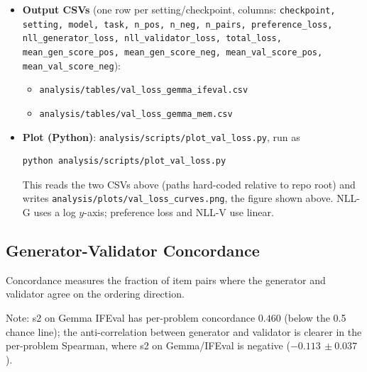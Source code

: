\documentclass[11pt,a4paper]{article}
\newcommand{\se}[1]{{\,\scriptstyle\pm#1}}
\begin{document}
\begin{itemize}
\begin{verbatim}
# Membership val-loss, evaluated on rosch (5 jobs: 44831-44835, ~14m each)
TASK=membership-sans-rosch-v0 \
TEST_TASK=rosch-all \
OUTPUT=analysis/tables/val_loss_gemma_mem.csv \
bash scripts/run_val_loss.sh
\end{verbatim}
Both runs use the default \texttt{MODEL=google/gemma-2-9b-it}, \texttt{MODELS\_DIR=/datastor2/jdr/rankalign/models2-rerun-wandb}, and \texttt{SETTINGS="s1 s2 s3 s4 s7"}.
\item \textbf{Output CSVs} (one row per setting/checkpoint, columns: \texttt{checkpoint, setting, model, task, n\_pos, n\_neg, n\_pairs, preference\_loss, nll\_generator\_loss, nll\_validator\_loss, total\_loss, mean\_gen\_score\_pos, mean\_gen\_score\_neg, mean\_val\_score\_pos, mean\_val\_score\_neg}):
\begin{itemize}
\item \texttt{analysis/tables/val\_loss\_gemma\_ifeval.csv}
\item \texttt{analysis/tables/val\_loss\_gemma\_mem.csv}
\end{itemize}
\item \textbf{Plot (Python)}: \texttt{analysis/scripts/plot\_val\_loss.py}, run as
\begin{verbatim}
python analysis/scripts/plot_val_loss.py
\end{verbatim}
This reads the two CSVs above (paths hard-coded relative to repo root) and writes \texttt{analysis/plots/val\_loss\_curves.png}, the figure shown above. NLL-G uses a log $y$-axis; preference loss and NLL-V use linear.
\end{itemize}

\subsection{Generator-Validator Concordance}

Concordance measures the fraction of item pairs where the generator and validator agree on the ordering direction.

\begin{table}[H]
\centering
\caption{Concordance at epoch 2 (self-TC scoring), per-problem mean$\pm$SE. Chance = 0.5.}
\label{tab:concordance}

\end{table}

Note: s2 on Gemma IFEval has per-problem concordance $0.460$ (below the 0.5 chance line); the
anti-correlation between generator and validator is clearer in the per-problem Spearman, where s2
on Gemma/IFEval is negative ($-0.113\se{0.037}$).
\end{document}
